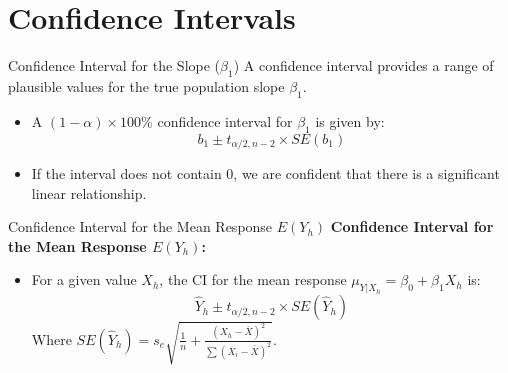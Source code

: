 \documentclass[aspectratio=169]{beamer}
\begin{document}
\section{Confidence Intervals}
\begin{frame}{Confidence Interval for the Slope ($\beta_1$)}
  A confidence interval provides a range of plausible values for the true population slope $\beta_1$.
  \begin{itemize}
    \item A $(1-\alpha) \times 100\%$ confidence interval for $\beta_1$ is given by:
    \begin{equation*}
      b_1 \pm t_{\alpha/2, n-2} \times SE(b_1)
    \end{equation*}
    \item If the interval does not contain 0, we are confident that there is a significant linear relationship.
  \end{itemize}
\end{frame}

\begin{frame}{Confidence Interval for the Mean Response $E(Y_h)$}
  \textbf{Confidence Interval for the Mean Response $E(Y_h)$:}
  \begin{itemize}
    \item For a given value $X_h$, the CI for the mean response $\mu_{Y|X_h} = \beta_0 + \beta_1 X_h$ is:
    \begin{equation*}
      \hat{Y}_h \pm t_{\alpha/2, n-2} \times SE(\hat{Y}_h)
    \end{equation*}
    Where $SE(\hat{Y}_h) = s_e \sqrt{\frac{1}{n} + \frac{(X_h - \bar{X})^2}{\sum (X_i - \bar{X})^2}}$.
  \end{itemize}
\end{frame}
\end{document}
